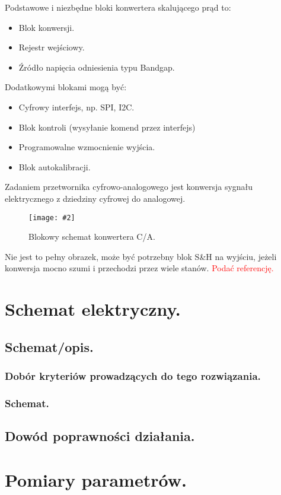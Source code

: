 \documentclass[10pt,a4paper]{report}
\newcommand{\img}[4]{
	\begin{figure}[H]
		\begin{center}
			\texttt{[image: \#2]}
			\caption{#3}
			\label{#4}
		\end{center}
	\end{figure}
}
\begin{document}
	{	Podstawowe i niezbędne bloki konwertera skalującego prąd to:
		\begin{itemize}
			\item Blok konwersji.
			\item Rejestr wejściowy.
			\item Źródło napięcia odniesienia typu Bandgap.
		\end{itemize}
		Dodatkowymi blokami mogą być:
		\begin{itemize}
			\item Cyfrowy interfejs, np. SPI, I2C.
			\item Blok kontroli (wysyłanie komend przez interfejs)
			\item Programowalne wzmocnienie wyjścia.
			\item Blok autokalibracji.
		\end{itemize}	
	}
	{
		
	}
	Zadaniem przetwornika cyfrowo-analogowego jest konwersja sygnału elektrycznego z dziedziny cyfrowej do analogowej.
	
	
	\img{20}{../visio/blokschkonca.pdf}{Blokowy schemat konwertera C/A.}{blokschkonca}
	
	Nie jest to pełny obrazek, może być potrzebny blok S\&H na wyjściu, jeżeli konwersja mocno szumi i przechodzi przez wiele stanów. \textcolor{red}{Podać referencję.}
	

	
	
	  
	\chapter{Schemat elektryczny.}
	\section{Schemat/opis.}
	\subsection{Dobór kryteriów prowadzących do tego rozwiązania.}
	\subsection{Schemat.}
	\section{Dowód poprawności działania.}

	\chapter{Pomiary parametrów.}
\end{document}
